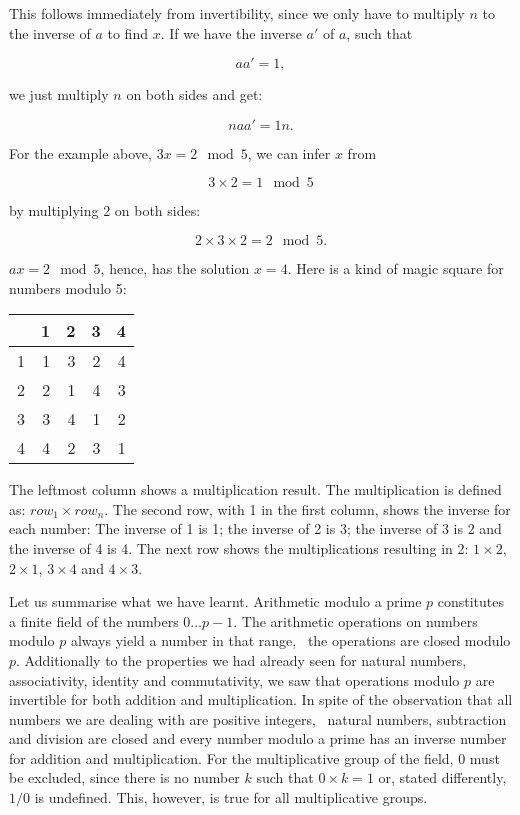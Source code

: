 \documentclass{scrreprt}
\begin{document}
This follows immediately from invertibility, 
since we only have to multiply $n$ to the inverse of $a$
to find $x$. If we have the inverse $a'$ of $a$, such that

\begin{equation}
  aa' = 1,
\end{equation}

we just multiply $n$ on both sides and get:

\begin{equation}
  naa' = 1n.
\end{equation}

For the example above, $3x = 2 \mod{5}$,
we can infer $x$ from

\begin{equation}
  3 \times 2 = 1 \mod{5}
\end{equation}

by multiplying 2 on both sides:

\begin{equation}
  2 \times 3 \times 2 = 2 \mod{5}.
\end{equation}

$ax = 2 \mod{5}$, hence, has the solution $x = 4$.
Here is a kind of magic square for numbers modulo 5:

\begin{center}
\begin{tabular}{|r||r|r|r|r|}\hline
   &  1  & 2 &  3 &  4\\\hline\hline
 1 &  1  & 3 &  2 &  4\\\hline
 2 &  2  & 1 &  4 &  3\\\hline
 3 &  3  & 4 &  1 &  2\\\hline
 4 &  4  & 2 &  3 &  1\\\hline
\end{tabular}
\end{center}

The leftmost column shows a multiplication result.
The multiplication is defined as: $row_1 \times row_n$.
The second row, with 1 in the first column,
shows the inverse for each number:
The inverse of 1 is 1; the inverse of 2 is 3;
the inverse of 3 is 2 and the inverse of 4 is 4.
The next row shows the multiplications resulting
in 2: $1 \times 2$, $2 \times 1$, $3 \times 4$ and
$4 \times 3$.

Let us summarise 
what we have learnt. Arithmetic modulo a prime $p$
constitutes a finite field of the numbers $0\dots p-1$.
The arithmetic operations on numbers modulo $p$ always yield 
a number in that range, \ie\ the operations are closed modulo $p$.
Additionally to the properties we had already seen for natural numbers,
associativity, identity and commutativity,
we saw that operations modulo $p$ are invertible for both
addition and multiplication.
In spite of the observation that all numbers we are dealing with
are positive integers, \ie\ natural numbers,
subtraction and division are closed and every number modulo a prime
has an inverse number for addition and multiplication.
For the multiplicative group of the field, 0 must be excluded,
since there is no number $k$ such that $0 \times k = 1$ or,
stated differently, $1/0$ is undefined.
This, however, is true for all multiplicative groups.
\end{document}
